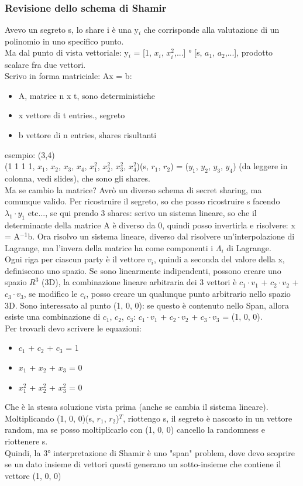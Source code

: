 \documentclass[16px]{article}
\begin{document}
\subsubsection{Revisione dello schema di Shamir}
Avevo un segreto s, lo share i è una y$_i$ che corrisponde alla valutazione di un polinomio in uno specifico punto.\\ Ma dal punto di vista vettoriale: y$_i$ = [1, $x_i$, $x_i^2$,...] $°$ [s, $a_1$, $a_2$,...], prodotto scalare fra due vettori.\\ Scrivo in forma matriciale: Ax = b:\\
\begin{itemize}
\item A, matrice n x t, sono deterministiche
\item x vettore di t entries., segreto
\item b vettore di n entries, shares risultanti
\end{itemize}
esempio: (3,4)\\
(1 1 1 1, $x_1$, $x_2$, $x_3$, $x_4$, $x_1^2$, $x_2^2$, $x_3^2$, $x_4^2$)(s, $r_1$, $r_2$) = ($y_1$, $y_2$, $y_3$, $y_4$) (da leggere in colonna, vedi slides), che sono gli shares.\\ Ma se cambio la matrice? Avrò un diverso schema di secret sharing, ma comunque valido. Per ricostruire il segreto, so che posso ricostruire s facendo $\lambda_1\cdot y_1$ etc..., se qui prendo 3 shares: scrivo un sistema lineare, so che il determinante della matrice A è diverso da 0, quindi posso invertirla e risolvere: x = A$^{-1}$b. Ora risolvo un sistema lineare, diverso dal risolvere un'interpolazione di Lagrange, ma l'invera della matrice ha come componenti i $\Lambda_i$ di Lagrange.\\ Ogni riga per ciascun party è il vettore $v_i$, quindi a seconda del valore della x, definiscono uno spazio. Se sono linearmente indipendenti, possono creare uno spazio $R^3$ (3D), la combinazione lineare arbitraria dei 3 vettori è $c_1\cdot v_1$ + $c_2\cdot v_2$ + $c_3\cdot v_3$, se modifico le $c_i$, posso creare un qualunque punto arbitrario nello spazio 3D. Sono interessato al punto (1, 0, 0): se questo è contenuto nello Span, allora esiste una combinazione di $c_1$, $c_2$, $c_3$: $c_1\cdot v_1$ + $c_2\cdot v_2$ + $c_3\cdot v_3$ = (1, 0, 0).\\ Per trovarli devo scrivere le equazioni:\\
\begin{itemize}
\item $c_1$ + $c_2$ + $c_3$ = 1
\item $x_1$ + $x_2$ + $x_3$ = 0
\item $x_1^2$ + $x_2^2$ + $x_3^2$ = 0
\end{itemize}
Che è la stessa soluzione vista prima (anche se cambia il sistema lineare).\\ Moltiplicando (1, 0, 0)(s, $r_1$, $r_2$)$^T$, riottengo s, il segreto è nascosto in un vettore random, ma se posso moltiplicarlo con (1, 0, 0) cancello la randomness e riottenere s.\\ Quindi, la 3° interpretazione di Shamir è uno "span" problem, dove devo scoprire se un dato insieme di vettori questi generano un sotto-insieme che contiene il vettore (1, 0, 0)
\end{document}
